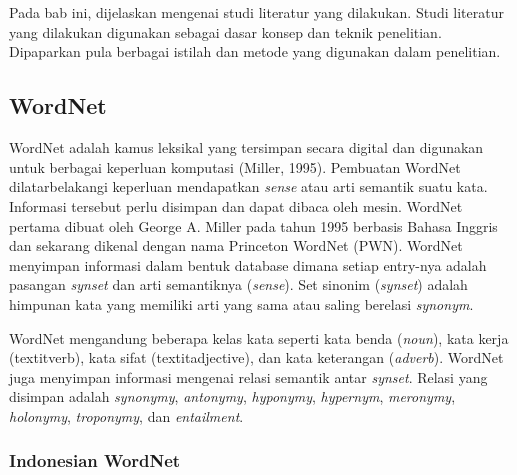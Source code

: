 \chapter{\babDua}
Pada bab ini, dijelaskan mengenai studi literatur yang dilakukan. Studi literatur yang dilakukan digunakan sebagai dasar konsep dan teknik penelitian. Dipaparkan pula berbagai istilah dan metode yang digunakan dalam penelitian.

\section{WordNet}
WordNet adalah kamus leksikal yang tersimpan secara digital dan digunakan untuk berbagai keperluan komputasi (Miller, 1995). Pembuatan WordNet dilatarbelakangi keperluan mendapatkan \textit{sense} atau arti semantik suatu kata. Informasi tersebut perlu disimpan dan dapat dibaca oleh mesin. WordNet pertama dibuat oleh George A. Miller pada tahun 1995 berbasis Bahasa Inggris dan sekarang dikenal dengan nama Princeton WordNet (PWN). WordNet menyimpan informasi dalam bentuk database dimana setiap entry-nya adalah pasangan \textit{synset} dan arti semantiknya (\textit{sense}). Set sinonim (\textit{synset}) adalah himpunan kata yang memiliki arti yang sama atau saling berelasi \textit{synonym}. 

WordNet mengandung beberapa kelas kata seperti kata benda (\textit{noun}), kata kerja (textit{verb}), kata sifat (textit{adjective}), dan kata keterangan (\textit{adverb}). WordNet juga menyimpan informasi mengenai relasi semantik antar \textit{synset}. Relasi yang disimpan adalah \textit{synonymy}, \textit{antonymy}, \textit{hyponymy}, \textit{hypernym}, \textit{meronymy}, \textit{holonymy}, \textit{troponymy}, dan \textit{entailment}.

\subsection{Indonesian WordNet}

